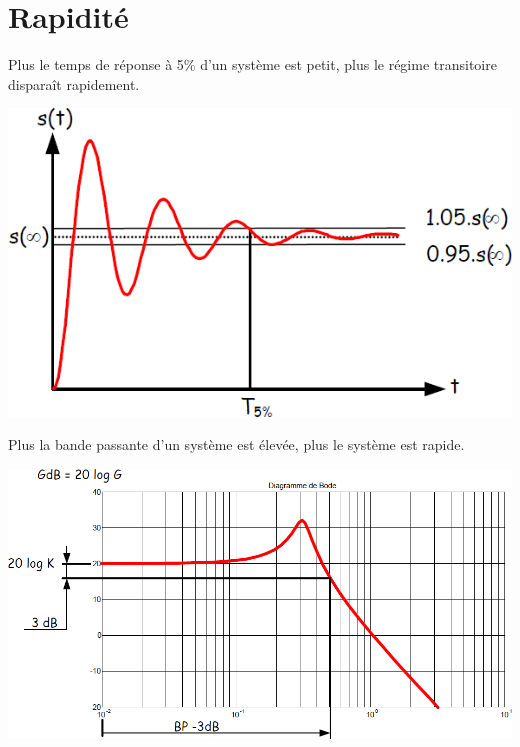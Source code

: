 \documentclass[10pt,fleqn]{article} %
\begin{document}
\section{Rapidité}
\noindent\begin{minipage}[c]{.75\linewidth}
\begin{resultat}
Plus le temps de réponse à 5\;\% d'un système est petit, plus le régime transitoire disparaît rapidement.
\end{resultat}
\end{minipage} \hfill
\begin{minipage}[c]{.2\linewidth}
\begin{center}
\includegraphics[width=\linewidth]{images/t5pcent}
\end{center}
\end{minipage}

\noindent\begin{minipage}[c]{.75\linewidth}
\begin{resultat}
Plus la bande passante d'un système est élevée, plus le système est rapide.
\end{resultat}
\end{minipage} \hfill
\begin{minipage}[c]{.2\linewidth}
\begin{center}
\includegraphics[width=\linewidth]{images/bandepassante}
\end{center}
\end{minipage}
\end{document}
